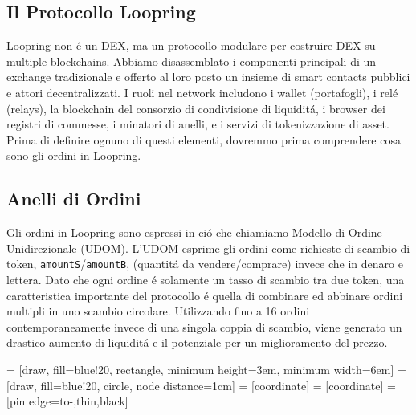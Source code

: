 \documentclass[UTF8,nofonts]{article}
\makeatletter
\newenvironment{figurehere}
 {\def\@captype{figure}}
 {}
\makeatother
\begin{document}
\begin{multicols}{2}
\section{Il Protocollo Loopring\label{sec:loopring_protocol}}
Loopring non \'e un DEX, ma un protocollo modulare per costruire DEX su multiple blockchains. Abbiamo disassemblato i componenti principali di un exchange tradizionale e offerto al loro posto un insieme di smart contacts pubblici e attori decentralizzati. I ruoli nel network  includono i wallet (portafogli), i rel\'e (relays), la blockchain del consorzio di condivisione di liquidit\'a, i browser dei registri di commesse, i minatori di anelli, e i servizi di tokenizzazione di asset. Prima di definire ognuno di questi elementi, dovremmo prima comprendere cosa sono gli ordini in Loopring.

\subsection{Anelli di Ordini\label{sec:order_ring}}
Gli ordini in Loopring sono espressi in ci\'o che chiamiamo Modello di Ordine Unidirezionale (UDOM)\cite{coinport2014udom}. L'UDOM esprime gli ordini come richieste di scambio di token, \verb|amountS|/\verb|amountB|, (quantit\'a da vendere/comprare) invece che in denaro e lettera. Dato che ogni ordine \'e solamente un tasso di scambio tra due token, una caratteristica importante del protocollo \'e quella di combinare ed abbinare ordini multipli in uno scambio circolare. Utilizzando fino a 16 ordini contemporaneamente invece di una singola coppia di scambio, viene generato un drastico aumento di liquidit\'a e il potenziale per un miglioramento del prezzo.

\begin{center}
\begin{figurehere}
\centering
{} = [draw, fill=blue!20, rectangle,
    minimum height=3em, minimum width=6em]
 = [draw, fill=blue!20, circle, node distance=1cm]
 = [coordinate]
 = [coordinate]
 = [pin edge={to-,thin,black}]

\begin{tikzpicture}[
    auto,
    node distance=2cm,
    >=latex',
    font=\bfseries\footnotesize\sffamily,
    order/.style={
		scale=0.7,
		rectangle,
		rounded corners,
		draw=black,
		text centered,
		minimum height=12mm,
		fill=white
	},
	label/.style={
		scale=0.7
	}
  ]


\end{tikzpicture}
\end{figurehere}
\end{center}
\end{multicols}
\end{document}
